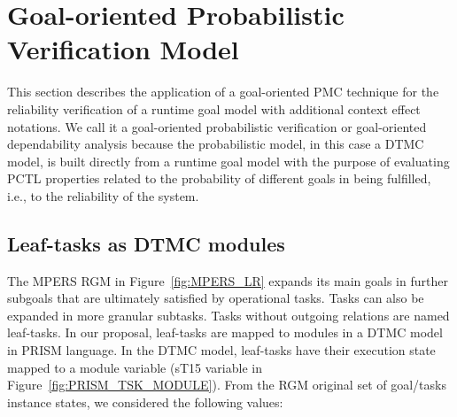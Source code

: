 \section{Goal-oriented Probabilistic Verification Model}\label{ssec:NFR-verification}


This section describes the application of a goal-oriented PMC technique for the reliability verification of a runtime goal model with additional context effect notations. We call it a goal-oriented probabilistic verification or goal-oriented dependability analysis because the probabilistic model, in this case a DTMC model, is built directly from a runtime goal model with the purpose of evaluating PCTL properties related to the probability of different goals in being fulfilled, i.e., to the reliability of the system.


\subsection{Leaf-tasks as DTMC modules}


The MPERS RGM in Figure~\ref{fig:MPERS_LR} expands its main goals in further subgoals that are ultimately satisfied by operational tasks. Tasks can also be expanded in more granular subtasks. Tasks without outgoing relations are named leaf-tasks. In our proposal, leaf-tasks are mapped to modules in a DTMC model in PRISM language. In the DTMC model, leaf-tasks have their execution state mapped to a module variable (sT15 variable in Figure~\ref{fig:PRISM_TSK_MODULE}). From the RGM original set of goal/tasks instance states, we considered the following values:

